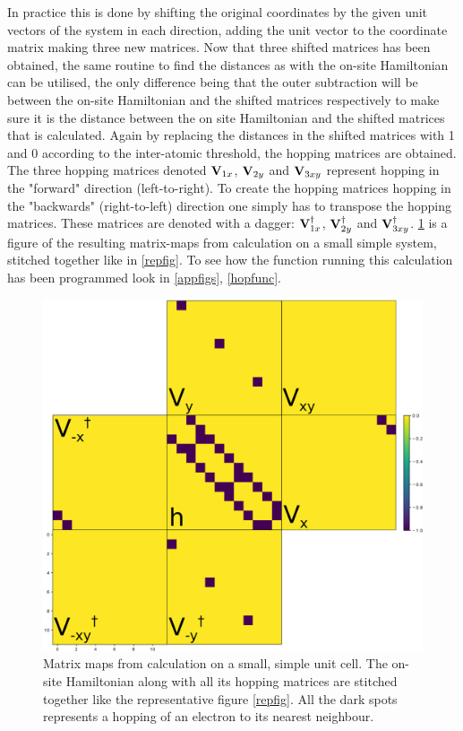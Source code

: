 In practice this is done by shifting the original coordinates by the given unit vectors of the system in each direction, adding the unit vector to the coordinate matrix making three new matrices. Now that three shifted matrices has been obtained, the same routine to find the distances as with the on-site Hamiltonian can be utilised, the only difference being that the outer subtraction will be between the on-site Hamiltonian and the shifted matrices respectively to make sure it is the distance between the on site Hamiltonian and the shifted matrices that is calculated. Again by replacing the distances in the shifted matrices with 1 and 0 according to the inter-atomic threshold, the hopping matrices are obtained. The three hopping matrices denoted \(\vb{V}_{1x}\), \(\vb{V}_{2y}\) and \(\vb{V}_{3xy}\) represent hopping in the "forward" direction (left-to-right). To create the hopping matrices hopping in the "backwards" (right-to-left) direction one simply has to transpose the hopping matrices. These matrices are denoted with a dagger: \(\vb{V}_{1x}^{\dagger}\), \(\vb{V}_{2y}^{\dagger}\) and \(\vb{V}_{3xy}^{\dagger}\). \cref{matrixmap} is a figure of the resulting matrix-maps from calculation on a small simple system, stitched together like in \cref{repfig}. To see how the function running this calculation has been programmed look in \cref{appfigs}, \cref{hopfunc}. 
\begin{figure}[H]
	\centering
	\includegraphics[width=\textwidth]{Figures/stitch.eps}
	\caption{Matrix maps from calculation on a small, simple unit cell. The on-site Hamiltonian along with all its hopping matrices are stitched together like the representative figure \cref{repfig}. All the dark spots represents a hopping of an electron to its nearest neighbour.}
	\label{matrixmap}
\end{figure}
